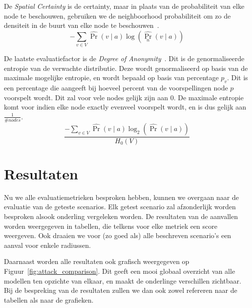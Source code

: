 De \textit{Spatial Certainty} is de certainty, maar in plaats van de
probabiliteit van elke node te beschouwen, gebruiken we de neighboorhood
probabiliteit om zo de densiteit in de buurt van elke node te
beschouwen~\cite{Dhondt}.
\begin{equation}
    -\sum_{v \in V} \widehat{\operatorname{Pr}}(v \mid a) \log \left(\widehat{\operatorname{Pr}_n}(v \mid a)\right)\label{eq:spatial_certainty}
\end{equation}

De laatste evaluatiefactor is de \textit{Degree of
    Anonymity}~\cite{Dhondt,Verdonck_2022}. Dit is de genormaliseerde entropie van
de verwachte distributie. Deze wordt genormaliseerd op basis van de maximale
mogelijke entropie, en wordt bepaald op basis van percentage $p_v$. Dit is een
percentage die aangeeft bij hoeveel percent van de voorspellingen node $p$
voorspelt wordt. Dit zal voor vele nodes gelijk zijn aan 0. De maximale
entropie komt voor indien elke node exactly evenveel voorspelt wordt, en is dus
gelijk aan $\frac{1}{\# nodes}$.
\begin{equation}
    \frac{-\sum_{v \in V} \widehat{\operatorname{Pr}}(v \mid a) \log _2(\widehat{\operatorname{Pr}}(v \mid a))}{H_0(V)}\label{eq:degree_of_anonymity}
\end{equation}

\section{Resultaten}
Nu we alle evaluatiemetrieken besproken hebben, kunnen we overgaan naar de
evaluatie van de geteste scenarios. Elk getest scenario zal afzonderlijk worden
besproken alsook onderling vergeleken worden. De resultaten van de aanvallen
worden weergegeven in tabellen, die telkens voor elke metriek een score
weergeven. Ook draaien we voor (zo goed als) alle beschreven scenario's een
aanval voor enkele radiussen.

Daarnaast worden alle resultaten ook grafisch weergegeven op
Figuur~\ref{fig:attack_comparison}. Dit geeft een mooi globaal overzicht van
alle modellen ten opzichte van elkaar, en maakt de onderlinge verschillen
zichtbaar. Bij de bespreking van de resultaten zullen we dan ook zowel
refereren naar de tabellen als naar de grafieken.

